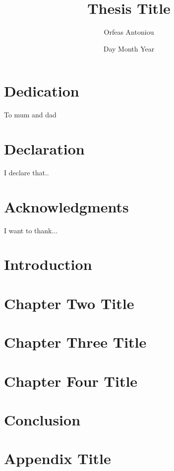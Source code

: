 \documentclass[12pt,twoside]{report}
\title{Thesis Title}
\author{Orfeas Antoniou}
\date{Day Month Year}
\begin{document}



\chapter*{Dedication}
To mum and dad

\chapter*{Declaration}
I declare that..

\chapter*{Acknowledgments}
I want to thank...

\tableofcontents

\chapter{Introduction}


\chapter{Chapter Two Title}


\chapter{Chapter Three Title}


\chapter{Chapter Four Title}


\chapter{Conclusion}


\appendix
\chapter{Appendix Title}

\printbibliography
\end{document}
